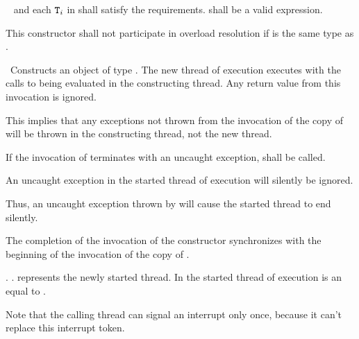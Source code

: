\begin{itemdescr}
  \pnum
\requires\  and each $\texttt{T}_i$ in  shall satisfy the
 requirements.
 shall be
a valid expression.

\pnum\remarks
This constructor shall not participate in overload resolution if 
is the same type as .

\pnum\effects\ Constructs an object of type . The new thread of execution executes
 with the calls to
 being evaluated in the constructing thread. Any return value from this invocation
is ignored. \begin{note} This implies that any exceptions not thrown from the invocation of the copy
of  will be thrown in the constructing thread, not the new thread. \end{note} If the
invocation of
termi\-nates with an uncaught exception,  shall be called.

{\color{insertnote}
An uncaught  exception in the started thread of execution
will silently be ignored.
\begin{note} Thus, an uncaught exception thrown by 
             will cause the started thread to end silently.
             \end{note}
}%

\pnum\sync The completion of the invocation of the constructor
synchronizes with the beginning of the invocation of the copy of .

{\color{insertnote}
\pnum\postconditions {}.
                     .
                      represents the newly started thread.
                     In the started thread of execution 
                     is an  equal to . 
\begin{note} Note that the calling thread can signal an interrupt only once,
                because it can't replace this interrupt token.  \end{note}
}%


\end{itemdescr}
